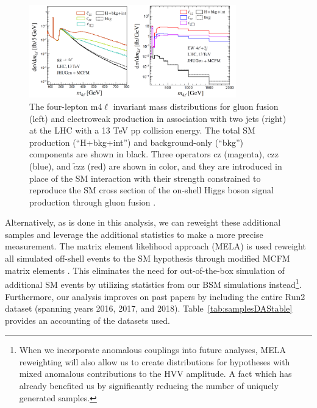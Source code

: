 \begin{figure}[!ht]
\centering
\includegraphics[width=0.8\textwidth,clip] {figures/offshellAC_BSI.png}
\caption{ The four-lepton m4$\ell$ invariant mass distributions for gluon fusion (left) and electroweak production in association with two jets (right) at the LHC with a 13 TeV pp collision energy. The total SM production (“H+bkg+int”) and background-only (“bkg”) components are shown in black. Three operators cz (magenta), czz (blue), and $\tilde{c}$zz (red) are shown
in color, and they are introduced in place of the SM interaction with their strength constrained
to reproduce the SM cross section of the on-shell Higgs boson signal production through gluon
fusion \cite{offshellWGnote}.}
\label{fig:offshellAC_BSI}
\end{figure}

Alternatively, as is done in this analysis, we can reweight these additional samples and leverage the additional statistics to make a more precise measurement. The matrix element likelihood approach (MELA) is used reweight all simulated off-shell events to the SM hypothesis through modified MCFM matrix elements \cite{12077235,10073492}. This eliminates the need for out-of-the-box simulation of additional SM events by utilizing statistics from our BSM simulations instead\footnote{When we incorporate anomalous couplings into future analyses, MELA reweighting will also allow us to create distributions for hypotheses with mixed anomalous contributions to the HVV amplitude. A fact which has already benefited us by significantly reducing the number of uniquely generated samples.}. Furthermore, our analysis improves on past papers \cite{190100174} by including the entire Run2 dataset (spanning years 2016, 2017, and 2018). Table~\ref{tab:samplesDAStable} provides an accounting of the datasets used.

